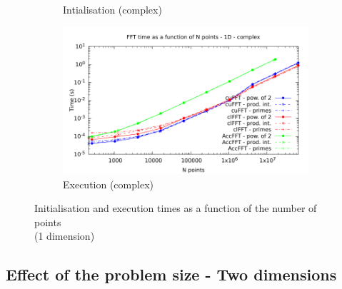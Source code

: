 \documentclass[12pt, a4paper]{article}
\begin{document}
\begin{figure}[H]
\begin{subfigure}{.5\textwidth}
\caption{Intialisation (complex)}
\label{FFT1DCI}
\end{subfigure}%
\begin{subfigure}{.5\textwidth}
\centering
\includegraphics[width=.9\linewidth]{graphs/fft-1d-c-exec.pdf}
\caption{Execution (complex)}
\label{FFT1DCE}
\end{subfigure}
\caption{Initialisation and execution times as a function of the number of points\\(1 dimension)}
\label{FFT1D}
\end{figure}

\subsection{Effect of the problem size - Two dimensions}
\end{document}
